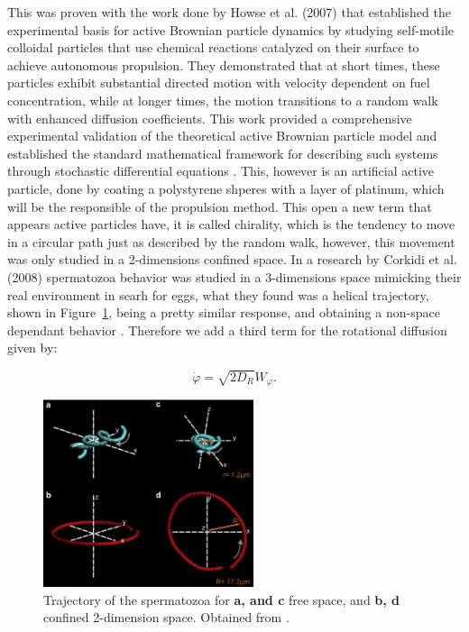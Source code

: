 This was proven with the work done by Howse et al. (2007) that established the experimental basis for active Brownian particle dynamics by studying self-motile colloidal particles that use chemical reactions catalyzed on their surface to achieve autonomous propulsion. They demonstrated that at short times, these particles exhibit substantial directed motion with velocity dependent on fuel concentration, while at longer times, the motion transitions to a random walk with enhanced diffusion coefficients. This work provided a comprehensive experimental validation of the theoretical active Brownian particle model and established the standard mathematical framework for describing such systems through stochastic differential equations \cite{howse2007self}. This, however is an artificial active particle, done by coating a polystyrene shperes with a layer of platinum, which will be the responsible of the propulsion method. This open a new term that appears active particles have, it is called chirality, which is the tendency to move in a circular path just as described by the random walk, however, this movement was only studied in a 2-dimensions confined space. In a research by Corkidi et al. (2008) spermatozoa behavior was studied in a 3-dimensions space mimicking their real environment in searh for eggs, what they found was a helical trajectory, shown in Figure~\ref{fig:corkidiexperiment}, being a pretty similar response, and obtaining a non-space dependant behavior \cite{corkidi2008tracking}. Therefore we add a third term for the rotational diffusion given by: 

\begin{equation}
  \dot{\varphi} = \sqrt{2D_R}W _{\varphi}.
  \label{eq:rotationaldiffusion}
\end{equation}

\begin{figure}[h]
  \begin{center}
    \includegraphics[width=0.55\textwidth]{figures/CorkidiExperiment.png}
  \end{center}
  \caption[Corkidi experiment.]{Trajectory of the spermatozoa for \textbf{a, and c} free space, and \textbf{b, d} confined 2-dimension space. Obtained from \cite{corkidi2008tracking}.}\label{fig:corkidiexperiment}
\end{figure}



